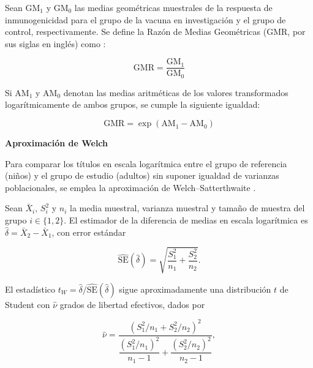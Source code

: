\begin{definition}
	Sean $\text{GM}_1$ y $\text{GM}_0$ las medias geométricas muestrales de la respuesta de inmunogenicidad para el grupo de la vacuna en investigación y el grupo de control, respectivamente. Se define la Razón de Medias Geométricas ($\text{GMR}$, por sus siglas en inglés) como \cite{nauta2020}:
	
	\begin{equation}
		\label{eq:gmr}
		\text{GMR} = \frac{\text{GM}_1}{\text{GM}_0}
	\end{equation}
	
	Si $\text{AM}_1$ y $\text{AM}_0$ denotan las medias aritméticas de los valores transformados logarítmicamente de ambos grupos, se cumple la siguiente igualdad:
	
	\begin{equation}
		\label{eq:gmr1}
		\text{GMR} = \exp(\text{AM}_1 - \text{AM}_0)
	\end{equation}
	
\end{definition}

\vspace{\baselineskip}
\textbf{Aproximación de Welch}
\vspace{\baselineskip}

Para comparar los títulos en escala logarítmica entre el grupo de referencia (niños) y el grupo de estudio (adultos) sin suponer igualdad de varianzas poblacionales, se emplea la aproximación de Welch--Satterthwaite \cite{Welch1947, Satterthwaite1946, Fuglsang2014}. 

Sean $\bar{X}_i$, $S_i^2$ y $n_i$ la media muestral, varianza muestral y tamaño de muestra del grupo $i \in \{1,2\}$. El estimador de la diferencia de medias en escala logarítmica es $\hat{\delta} = \bar{X}_2 - \bar{X}_1$, con error estándar

\begin{equation}\label{eq:se-welch}
	\widehat{\mathrm{SE}}(\hat{\delta}) =
	\sqrt{\frac{S_1^2}{n_1} + \frac{S_2^2}{n_2}}.
\end{equation}

El estadístico $t_W = \hat{\delta} / \widehat{\mathrm{SE}}(\hat{\delta})$ sigue aproximadamente una distribución $t$ de Student con $\hat{\nu}$ grados de libertad efectivos, dados por

\begin{equation}\label{eq:df-welch}
	\hat{\nu} = \frac{\left(S_1^2/n_1 + S_2^2/n_2\right)^2}
	{\dfrac{(S_1^2/n_1)^2}{n_1-1} + \dfrac{(S_2^2/n_2)^2}{n_2-1}},
\end{equation}

